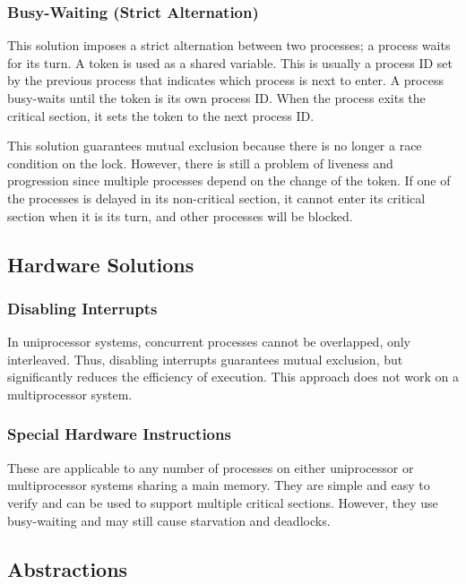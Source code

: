 \subsubsection{Busy-Waiting (Strict Alternation)}

This solution imposes a strict alternation between two processes; a process waits for its turn.
A token is used as a shared variable.
This is usually a process ID set by the previous process that indicates which process is next to enter.
A process busy-waits until the token is its own process ID.
When the process exits the critical section, it sets the token to the next process ID.

This solution guarantees mutual exclusion because there is no longer a race condition on the lock.
However, there is still a problem of liveness and progression since multiple processes depend on the change of the token.
If one of the processes is delayed in its non-critical section, it cannot enter its critical section when it is its turn, and other processes will be blocked.

\subsection{Hardware Solutions}

\subsubsection{Disabling Interrupts}

In uniprocessor systems, concurrent processes cannot be overlapped, only interleaved.
Thus, disabling interrupts guarantees mutual exclusion, but significantly reduces the efficiency of execution.
This approach does not work on a multiprocessor system.

\subsubsection{Special Hardware Instructions}

These are applicable to any number of processes on either uniprocessor or multiprocessor systems sharing a main memory.
They are simple and easy to verify and can be used to support multiple critical sections.
However, they use busy-waiting and may still cause starvation and deadlocks.

\subsection{Abstractions}

